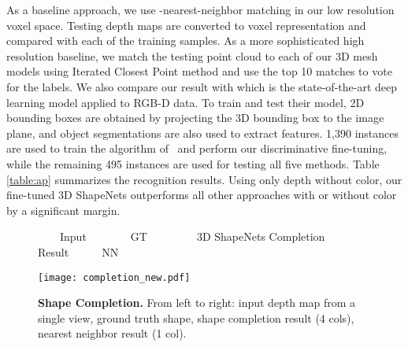 \documentclass[10pt,twocolumn,letterpaper]{article}
\begin{document}
As a baseline approach, we use -nearest-neighbor matching in our low resolution voxel space. Testing depth maps are converted to voxel representation and compared with each of the training samples.
As a more sophisticated high resolution baseline, we match the testing point cloud to each of our 3D mesh models using Iterated Closest Point method \cite{ICP} and use the top 10 matches to vote for the labels. 
We also compare our result with \cite{Socher} which is the state-of-the-art deep learning model applied to RGB-D data. 
To train and test their model, 2D bounding boxes are obtained by projecting the 3D bounding box to the image plane, and object segmentations are also used to extract features. 
1,390 instances are used to train the algorithm of~\cite{Socher} and perform our discriminative fine-tuning, while the remaining 495 instances
are used for testing all five methods. 
Table \ref{table:ap} summarizes the recognition results. 
Using only depth without color,
our fine-tuned 3D ShapeNets outperforms all other approaches with or without color by a significant margin.





\begin{figure}[t]
\vspace{-2mm}

{\small
~~~~Input~~~~~~~~GT~~~~~~~~~3D ShapeNets Completion Result~~~~~~NN
}

\vspace{-0.5mm}
\centering
\texttt{[image: completion\_new.pdf]}

\vspace{-3mm}
\caption{{\bf Shape Completion.} From left to right: input depth map from a single view, ground truth shape, shape completion result (4 cols), nearest neighbor result (1 col).}
\label{fig:shapecompletion}
\vspace{-3mm}
\end{figure}

\iffalse
\begin{figure}[t]
\centering
\vspace{-2mm}
\texttt{[image: new\_figures/NBV.pdf]}

\vspace{-3mm}
\caption{When the uncertainty of observation goes higher, the recognition accuracy drops. }
\label{fig:shapecompletion}
\vspace{-5mm}
\end{figure}
\fi
\end{document}
